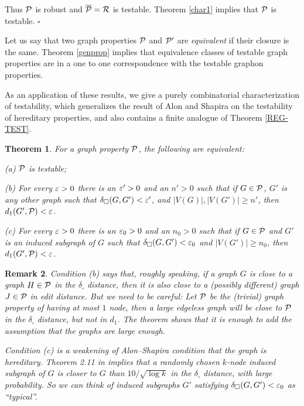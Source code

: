 \documentclass{article}
\newtheorem{theorem}{Theorem}[section]
\newtheorem{remark}[theorem]{Remark}
\newenvironment{proof}{\medskip\noindent{\bf Proof. }}{\hfill$\square$\medskip}
\begin{document}
\begin{proof}
Thus $\mathcal{P}$ is robust and $\overline{\mathcal{P}}=\mathcal{R}$ is testable. Theorem
\ref{char1} implies that $\mathcal{P}$ is testable.
\end{proof}

Let us say that two graph properties $\mathcal{P}$ and $\mathcal{P}'$ are {\it
equivalent} if their closure is the same. Theorem \ref{genprop}
implies that equivalence classes of testable graph properties are in
a one to one correspondence with the testable graphon properties.

As an application of these results, we give a purely combinatorial
characterization of testability, which generalizes the result of Alon
and Shapira on the testability of hereditary properties, and also
contains a finite analogue of Theorem \ref{REG-TEST}.


\begin{theorem}\label{COMBCHAR}
For a graph property $\mathcal{P}$, the following are equivalent:

\smallskip

{\rm (a)} $\mathcal{P}$ is testable;

\smallskip

{\rm (b)} For every $\varepsilon>0$ there is an $\varepsilon'>0$ and an $n'>0$ such
that if $G\in\mathcal{P}$, $G'$ is any other graph such that
$\delta_\square(G,G')<\varepsilon'$, and $|V(G)|, |V(G')|\ge n'$, then
$d_1(G',\mathcal{P})<\varepsilon$.

\smallskip

{\rm (c)} For every $\varepsilon>0$ there is an $\varepsilon_0>0$ and an $n_0>0$
such that if $G\in\mathcal{P}$ and $G'$ is an induced subgraph of $G$ such
that $\delta_\square(G,G')<\varepsilon_0$ and $|V(G')|\ge n_0$, then
$d_1(G',\mathcal{P})<\varepsilon$.
\end{theorem}

\begin{remark}
Condition (b) says that, roughly speaking, if a graph $G$ is close to
a graph $H\in\mathcal{P}$ in the $\delta_\square$ distance, then it is also
close to a (possibly different) graph $J\in\mathcal{P}$ in edit distance. But
we need to be careful: Let $\mathcal{P}$ be the (trivial) graph property of
having at most $1$ node, then a large edgeless graph will be close to
$\mathcal{P}$ in the $\delta_\square$ distance, but not in $d_1$. The theorem
shows that it is enough to add the assumption that the graphs are
large enough.

Condition (c) is a weakening of Alon--Shapira condition that the
graph is hereditary. Theorem 2.11 in \cite{BCLSV1} implies that a
randomly chosen $k$-node induced subgraph of $G$ is closer to $G$
than $10/\sqrt{\log k}$ in the $\delta_\square$ distance, with large
probability. So we can think of induced subgraphs $G'$ satisfying
$\delta_\square(G,G')<\varepsilon_0$ as ``typical''.
\end{remark}
\end{document}
